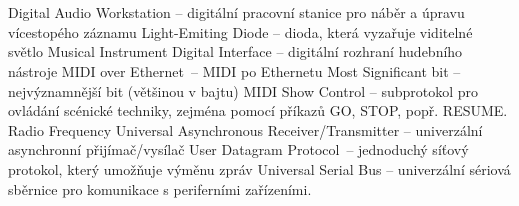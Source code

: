 \cleardoublepage
\chapter*{\listofabbrevname}
{}

\begin{acronym}[KolikMista]
    {Digital Audio Workstation -- digitální pracovní stanice pro náběr a úpravu vícestopého záznamu}
    {Light-Emiting Diode -- dioda, která vyzařuje viditelné světlo}
    {Musical Instrument Digital Interface -- digitální rozhraní hudebního nástroje}
    {\acs{MIDI} over Ethernet~-- \acs{MIDI} po Ethernetu}
    {Most Significant bit -- nejvýznamnější bit (většinou v bajtu)}
    {\acs{MIDI} Show Control -- subprotokol pro ovládání scénické techniky, zejména pomocí příkazů GO, STOP, popř. RESUME. \cite{MIDIspecs}}
    {Radio Frequency}
    {Universal Asynchronous Receiver/Transmitter -- univerzální asynchronní přijímač/vysílač}
    {User Datagram Protocol~-- jednoduchý síťový protokol, který umožňuje výměnu zpráv  \cite{UDPpaper}}
    {Universal Serial Bus -- univerzální sériová sběrnice pro komunikace s periferními zařízeními.}







%
%

\end{acronym}
